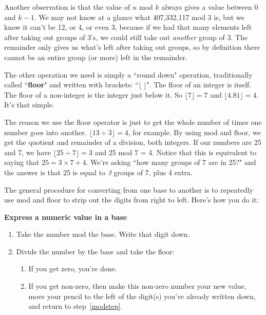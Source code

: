 Another observation is that the value of $n$ mod $k$ always gives a value
between 0 and $k-1$. We may not know at a glance what 407,332,117 mod 3 is,
but we know it can't be 12, or 4, or even 3, because if we had that many
elements left after taking out groups of 3's, we could still take out
\textit{another} group of 3. The remainder only gives us what's left after
taking out groups, so by definition there cannot be an entire group (or
more) left in the remainder.

The other operation we need is simply a ``round down" operation,
traditionally called ``\textbf{floor}" and written with brackets:
``$\lfloor \ \rfloor$". The floor of an integer is itself. The floor of a
non-integer is the integer just below it. So $\lfloor 7 \rfloor = 7$ and
$\lfloor 4.81 \rfloor = 4$. It's that simple.

The reason we use the floor operator is just to get the whole number of
times one number goes into another. $\lfloor 13 \div 3 \rfloor = 4$, for
example. By using mod and floor, we get the quotient and remainder of a
division, both integers. If our numbers are 25 and 7, we have $\lfloor 25
\div 7 \rfloor = 3$ and 25 mod 7 = 4. Notice that this is equivalent to
saying that $25 = 3 \times 7 + 4$. We're asking ``how many groups of 7 are
in 25?" and the answer is that 25 is equal to \textit{3} groups of 7, plus
4 extra.

The general procedure for converting from one base to another is to
repeatedly use mod and floor to strip out the digits from right to left. 
Here's how you do it:

\vspace{.1in}
\begin{framed}
\begin{samepage}
\textbf{Express a numeric value in a base}
\label{convertalgorithm}
\begin{enumerate}
\item \label{modstep} Take the number mod the base. Write that digit down.
\item \label{divstep} Divide the number by the base and take the floor:
    \begin{enumerate}
    \item \label{zerostep} If you get zero, you're done.
    \item \label{notzerostep} If you get non-zero, then make this non-zero
number your new value, move your pencil to the left of the digit(s) you've
already written down, and return to step~\ref{modstep}.
    \end{enumerate}
\end{enumerate}
\end{samepage}
\end{framed}
\vspace{.2in}

